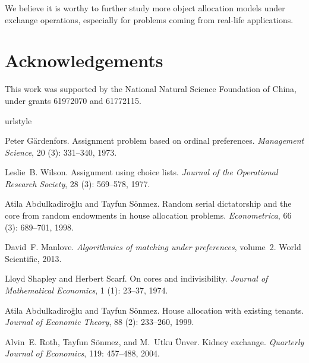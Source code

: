 We believe it is worthy to further study more object allocation models under exchange operations, especially for problems coming from real-life applications.


\section*{Acknowledgements}
This work was supported by the National Natural Science Foundation of China,
under grants 61972070 and 61772115.

\begin{thebibliography}{27}
\providecommand{\natexlab}[1]{#1}
\providecommand{\url}[1]{\texttt{#1}}
\expandafter\ifx\csname urlstyle\endcsname\relax
  \providecommand{\doi}[1]{doi: #1}\else
  \providecommand{\doi}{doi: \begingroup \urlstyle{rm}\Url}\fi

Peter G{\"a}rdenfors.
\newblock Assignment problem based on ordinal preferences.
\newblock \emph{Management Science}, 20 (3): 331--340, 1973.

Leslie~B. Wilson.
\newblock Assignment using choice lists.
\newblock \emph{Journal of the Operational Research Society}, 28
  (3): 569--578, 1977.

Atila Abdulkadiro{\u{g}}lu and Tayfun S{\"o}nmez.
\newblock Random serial dictatorship and the core from random endowments in
  house allocation problems.
\newblock \emph{Econometrica}, 66 (3): 689--701, 1998.

David~F. Manlove.
\newblock \emph{Algorithmics of matching under preferences}, volume~2.
\newblock World Scientific, 2013.

Lloyd Shapley and Herbert Scarf.
\newblock On cores and indivisibility.
\newblock \emph{Journal of Mathematical Economics}, 1 (1):
  23--37, 1974.

Atila Abdulkadiro{\u{g}}lu and Tayfun S{\"o}nmez.
\newblock House allocation with existing tenants.
\newblock \emph{Journal of Economic Theory}, 88 (2):
  233--260, 1999.

Alvin~E. Roth, Tayfun S{\"{o}}nmez, and M.~Utku {\"{U}}nver.
\newblock Kidney exchange.
\newblock \emph{Quarterly Journal of Economics}, 119: 457--488, 2004.


\end{thebibliography}

